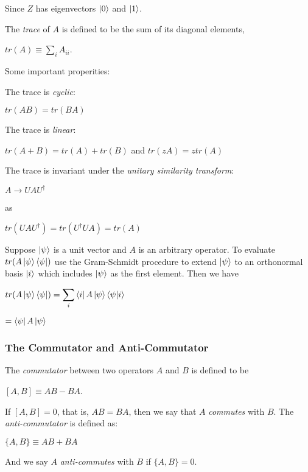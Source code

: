 \documentclass{article}
\begin{document}
Since $Z$ has eigenvectors $\ket{0}$ and $\ket{1}$.

The \emph{trace} of $A$ is defined to be the sum of its diagonal elements,
  \begin{center}
    $tr(A) \equiv \displaystyle\sum_{i} A_{ii}$.
  \end{center}
Some important properities:

The trace is \emph{cyclic}: 
  \begin{center}$tr(AB) = tr(BA)$\end{center}

The trace is \emph{linear}:
  \begin{center}$tr(A + B) = tr(A) + tr(B)$ and $tr(zA) = z tr(A)$\end{center}

The trace is invariant under the \emph{unitary similarity transform}:
  \begin{center}$A \rightarrow UAU^{\dagger}$\end{center}
as
  \begin{center}$tr(UAU^{\dagger}) = tr(U^{\dagger}UA) = tr(A)$\end{center}

Suppose $\ket{\psi}$ is a unit vector and $A$ is an arbitrary operator. To
evaluate $tr(A\ket{\psi}\bra{\psi})$ use the Gram-Schmidt procedure to extend
$\ket{\psi}$ to an orthonormal basis $\ket{i}$ which includes $\ket{\psi}$ as
the first element. Then we have

  \begin{center}
    $
      tr(A\ket{\psi}\bra{\psi}) =
      \displaystyle\sum_{i}\bra{i}A\ket{\psi}\bra{\psi}\ket{i}
    $
  \end{center}
  \begin{center}
    $
      = \bra{\psi}A\ket{\psi}
    $
  \end{center}

\subsubsection{The Commutator and Anti-Commutator}
The \emph{commutator} between two operators $A$ and $B$ is defined to be
  \begin{center}
    $[A, B] \equiv AB - BA$.
  \end{center}

If $[A, B] = 0$, that is, $AB = BA$, then we say that $A$ \emph{commutes} with 
$B$.  The \emph{anti-commutator} is defined as:
  \begin{center}
    $\{A, B\} \equiv AB + BA$
  \end{center}
And we say $A$ \emph{anti-commutes} with $B$ if $\{A, B\} = 0$.
\end{document}
